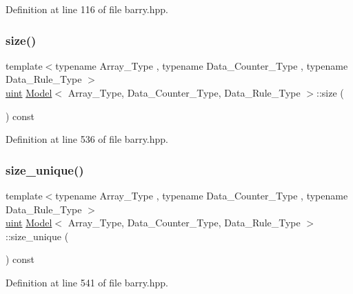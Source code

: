 Definition at line 116 of file barry.\+hpp.

\mbox{\label{classbarry_1_1_model_ab3f157dbb542a48fe5bf412ff7d467fd}} 
\subsubsection{\texorpdfstring{size()}{size()}}
{\footnotesize\ttfamily template$<$typename Array\+\_\+\+Type , typename Data\+\_\+\+Counter\+\_\+\+Type , typename Data\+\_\+\+Rule\+\_\+\+Type $>$ \\
\hyperlink{namespacebarry_a11dfc53ddb4672278319aa04f1e09a6c}{uint} \hyperlink{classbarry_1_1_model}{Model}$<$ Array\+\_\+\+Type, Data\+\_\+\+Counter\+\_\+\+Type, Data\+\_\+\+Rule\+\_\+\+Type $>$\+::size (\begin{DoxyParamCaption}{ }\end{DoxyParamCaption}) const\hspace{0.3cm}{\ttfamily [inline]}}



Definition at line 536 of file barry.\+hpp.

\mbox{\label{classbarry_1_1_model_a4b5edbe891b6da2319ea3fa6f1aba11d}} 
\subsubsection{\texorpdfstring{size\+\_\+unique()}{size\_unique()}}
{\footnotesize\ttfamily template$<$typename Array\+\_\+\+Type , typename Data\+\_\+\+Counter\+\_\+\+Type , typename Data\+\_\+\+Rule\+\_\+\+Type $>$ \\
\hyperlink{namespacebarry_a11dfc53ddb4672278319aa04f1e09a6c}{uint} \hyperlink{classbarry_1_1_model}{Model}$<$ Array\+\_\+\+Type, Data\+\_\+\+Counter\+\_\+\+Type, Data\+\_\+\+Rule\+\_\+\+Type $>$\+::size\+\_\+unique (\begin{DoxyParamCaption}{ }\end{DoxyParamCaption}) const\hspace{0.3cm}{\ttfamily [inline]}}



Definition at line 541 of file barry.\+hpp.

